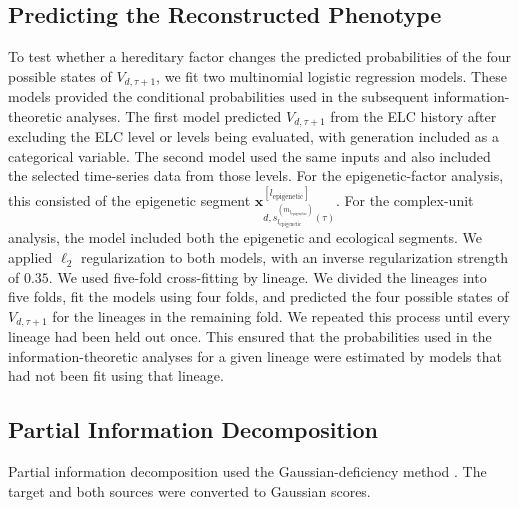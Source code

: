 \documentclass[11pt]{article}
\begin{document}
\subsection{Predicting the Reconstructed Phenotype}
To test whether a hereditary factor changes the predicted probabilities of the four possible states of $V_{d,\tau+1}$, we fit two multinomial logistic regression models. These models provided the conditional probabilities used in the subsequent information-theoretic analyses. The first model predicted $V_{d,\tau+1}$ from the ELC history after excluding the ELC level or levels being evaluated, with generation included as a categorical variable. The second model used the same inputs and also included the selected time-series data from those levels. For the epigenetic-factor analysis, this consisted of the epigenetic segment $\mathbf{x}^{[l_{\mathrm{epigenetic}}]}_{d,s_{l_{\mathrm{epigenetic}}}^{(m_{l_{\mathrm{epigenetic}}})}(\tau)}$. For the complex-unit analysis, the model included both the epigenetic and ecological segments. We applied $\ell_2$ regularization to both models, with an inverse regularization strength of $0.35$. We used five-fold cross-fitting by lineage. We divided the lineages into five folds, fit the models using four folds, and predicted the four possible states of $V_{d,\tau+1}$ for the lineages in the remaining fold. We repeated this process until every lineage had been held out once. This ensured that the probabilities used in the information-theoretic analyses for a given lineage were estimated by models that had not been fit using that lineage.

\subsection{Partial Information Decomposition}
Partial information decomposition used the Gaussian-deficiency method \cite{venkatesh2022}. The target and both sources were converted to Gaussian scores. 
\end{document}
